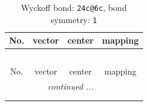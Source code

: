 \documentclass[fleqn,8pt]{jsarticle}
\begin{document}
\renewcommand{\arraystretch}{1.2}
\begin{longtable}{cccc}
\caption{Wyckoff bond: {\tt 24c@6c}, bond symmetry: {\tt 1}}
 \\
 \hline \hline
No. & vector & center & mapping \\ \hline \endfirsthead

\multicolumn{3}{l}{\tablename\ \thetable{}} \\
 \hline \hline
No. & vector & center & mapping \\ \hline \endhead

 \hline \hline
\multicolumn{3}{r}{\footnotesize\it continued ...} \\ \endfoot

 \hline \hline
\multicolumn{3}{r}{} \\ \endlastfoot


\end{longtable}
\end{document}
